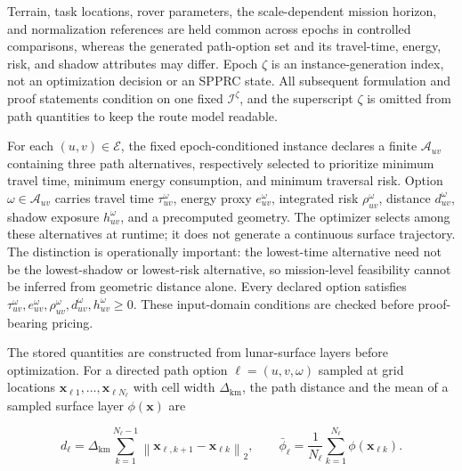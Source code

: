 \documentclass[
  11pt,
]{article}
\begin{document}
Terrain, task locations, rover parameters, the scale-dependent mission
horizon, and normalization references are held common across epochs in
controlled comparisons, whereas the generated path-option set and its
travel-time, energy, risk, and shadow attributes may differ. Epoch
\(\zeta\) is an instance-generation index, not an optimization decision
or an SPPRC state. All subsequent formulation and proof statements
condition on one fixed \(\mathcal{I}^{\zeta}\), and the superscript
\(\zeta\) is omitted from path quantities to keep the route model
readable.

For each \((u,v)\in\mathcal{E}\), the fixed epoch-conditioned instance
declares a finite \(\mathcal{A}_{uv}\) containing three path
alternatives, respectively selected to prioritize minimum travel time,
minimum energy consumption, and minimum traversal risk. Option
\(\omega\in\mathcal{A}_{uv}\) carries travel time
\(\tau_{uv}^{\omega}\), energy proxy \(e_{uv}^{\omega}\), integrated
risk \(\rho_{uv}^{\omega}\), distance \(d_{uv}^{\omega}\), shadow
exposure \(h_{uv}^{\omega}\), and a precomputed geometry. The optimizer
selects among these alternatives at runtime; it does not generate a
continuous surface trajectory. The distinction is operationally
important: the lowest-time alternative need not be the lowest-shadow or
lowest-risk alternative, so mission-level feasibility cannot be inferred
from geometric distance alone. Every declared option satisfies
\(\tau_{uv}^{\omega},e_{uv}^{\omega},\rho_{uv}^{\omega}, d_{uv}^{\omega},h_{uv}^{\omega}\ge0\).
These input-domain conditions are checked before proof-bearing pricing.

The stored quantities are constructed from lunar-surface layers before
optimization. For a directed path option \(\ell=(u,v,\omega)\) sampled
at grid locations
\(\boldsymbol{x}_{\ell 1},\ldots,\boldsymbol{x}_{\ell N_\ell}\) with
cell width \(\Delta_{\mathrm{km}}\), the path distance and the mean of a
sampled surface layer \(\phi(\boldsymbol{x})\) are

\[
d_\ell=\Delta_{\mathrm{km}}
\sum_{k=1}^{N_\ell-1}
\left\|\boldsymbol{x}_{\ell,k+1}-\boldsymbol{x}_{\ell k}\right\|_2,
\qquad
\bar\phi_\ell
=\frac{1}{N_\ell}\sum_{k=1}^{N_\ell}\phi(\boldsymbol{x}_{\ell k}).
\tag{1}
\]
\end{document}
